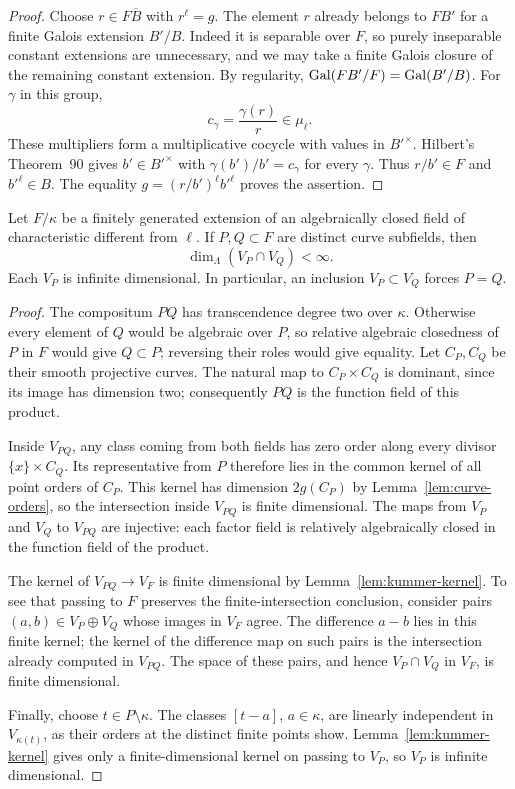 \begin{proof}
Choose $r\in F\overline B$ with $r^\ell=g$.  The element $r$ already
belongs to $FB'$ for a finite Galois extension $B'/B$.  Indeed it is
separable over $F$, so purely inseparable constant extensions are
unnecessary, and we may take a finite Galois closure of the remaining
constant extension.  By regularity,
$\operatorname{Gal}(FB'/F)=\operatorname{Gal}(B'/B)$.  For $\gamma$ in this group,
\[
                         c_\gamma=\frac{\gamma(r)}r\in\mu_\ell.
\]
These multipliers form a multiplicative cocycle with values in $B'^\times$.
Hilbert's Theorem~90 gives $b'\in B'^\times$ with
$\gamma(b')/b'=c_\gamma$ for every $\gamma$.  Thus $r/b'\in F$ and
$b'^\ell\in B$.  The equality
$g=(r/b')^\ell b'^\ell$ proves the assertion.
\end{proof}

\begin{lemma}
\label{lem:curve-intersection}
Let $F/\kappa$ be a finitely generated extension of an algebraically
closed field of characteristic different from $\ell$.  If $P,Q\subset F$
are distinct curve subfields, then
\[
                          \dim_\Lambda(V_P\cap V_Q)<\infty.
\]
Each $V_P$ is infinite dimensional.  In particular, an inclusion
$V_P\subset V_Q$ forces $P=Q$.
\end{lemma}

\begin{proof}
The compositum $PQ$ has transcendence degree two over $\kappa$.
Otherwise every element of $Q$ would be algebraic over $P$, so relative
algebraic closedness of $P$ in $F$ would give $Q\subset P$; reversing
their roles would give equality.
Let $C_P,C_Q$ be their smooth projective curves.  The natural map to
$C_P\times C_Q$ is dominant, since its image has dimension two;
consequently $PQ$ is the function field of this product.

Inside $V_{PQ}$, any class coming from both fields has zero order along
every divisor $\{x\}\times C_Q$.  Its representative from $P$ therefore
lies in the common kernel of all point orders of $C_P$.  This kernel has
dimension $2g(C_P)$ by Lemma~\ref{lem:curve-orders}, so the intersection
inside $V_{PQ}$ is finite dimensional.  The maps from $V_P$ and $V_Q$
to $V_{PQ}$ are injective: each factor field is relatively algebraically
closed in the function field of the product.

The kernel of $V_{PQ}\to V_F$ is finite dimensional by
Lemma~\ref{lem:kummer-kernel}.  To see that passing to $F$ preserves the
finite-intersection conclusion, consider pairs $(a,b)\in V_P\oplus V_Q$
whose images in $V_F$ agree.  The difference $a-b$ lies in this finite
kernel; the kernel of the difference map on such pairs is the intersection
already computed in $V_{PQ}$.  The space of these pairs, and hence
$V_P\cap V_Q$ in $V_F$, is finite dimensional.

Finally, choose $t\in P\setminus\kappa$.  The classes $[t-a]$,
$a\in\kappa$, are linearly independent in $V_{\kappa(t)}$, as their
orders at the distinct finite points show.  Lemma~\ref{lem:kummer-kernel}
gives only a finite-dimensional kernel on passing to $V_P$, so $V_P$
is infinite dimensional.
\end{proof}

